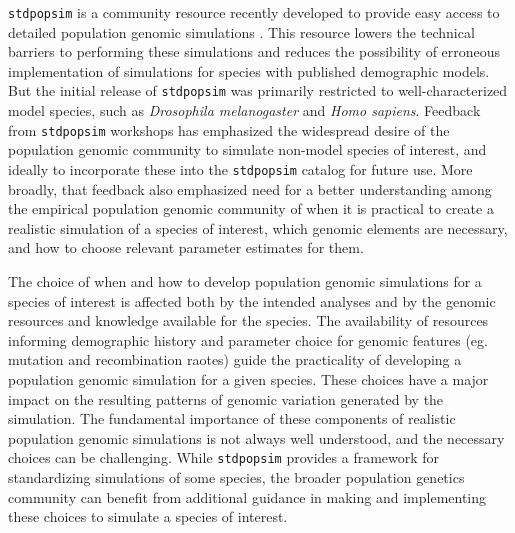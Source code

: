 \documentclass[hidelinks]{article}
\newcommand{\stdpopsim}{\texttt{stdpopsim}\xspace}
\begin{document}
\stdpopsim is a community resource recently developed to provide easy
access to detailed population genomic simulations \citep{Adrion2020}. This
resource lowers the technical barriers to performing these simulations
and reduces the possibility of erroneous implementation of simulations
for species with published demographic models. 
But the initial release of \stdpopsim was
primarily restricted to well-characterized model species, such as
\emph{Drosophila melanogaster} and \emph{Homo sapiens}. Feedback from
\stdpopsim workshops has emphasized the widespread desire of the
population genomic community to simulate
non-model species of interest, 
and ideally to incorporate these into the \stdpopsim catalog for future use.
More broadly, that feedback also emphasized need for a 
better understanding among the empirical population
genomic community of when it is practical to create a realistic
simulation of a species of interest, which genomic elements are
necessary, and how to choose relevant parameter estimates for them.

The choice of when and how to develop population genomic
simulations for a species of interest is affected both by the intended
analyses and by the genomic resources and knowledge available for the
species. The availability of resources informing demographic history 
and parameter choice for genomic features (eg. mutation and recombination
raotes) guide the practicality
of developing a population genomic simulation for a given species.
These choices have a major impact on the resulting patterns of
genomic variation generated by the simulation. The fundamental
importance of these components of realistic population genomic
simulations is not always well understood, and the necessary choices can
be challenging. While \stdpopsim provides a framework for standardizing
simulations of some species, the broader population genetics community
can benefit from additional guidance in making and implementing these
choices to simulate a species of interest.
\end{document}
